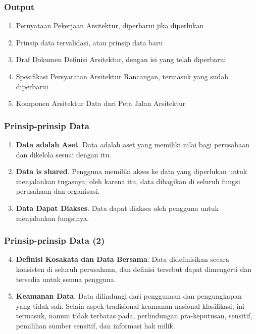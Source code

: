 \documentclass[aspectratio=169, table]{beamer}
\begin{document}
	\begin{frame}
		\frametitle{Output}
		\begin{enumerate}
			\item Pernyataan Pekerjaan Arsitektur, diperbarui jika diperlukan
			\item Prinsip data tervalidasi, atau prinsip data baru
			\item Draf Dokumen Definisi Arsitektur, dengan isi yang telah diperbarui
			\item Spesifikasi Persyaratan Arsitektur Rancangan, termasuk yang sudah diperbarui
			\item Komponen Arsitektur Data dari Peta Jalan Arsitektur
		\end{enumerate}
	\end{frame}

	\begin{frame}
		\frametitle{Prinsip-prinsip Data}
		\begin{enumerate}
			\item \textbf{Data adalah Aset}.
			Data adalah aset yang memiliki nilai bagi perusahaan dan dikelola sesuai dengan itu.
			\item \textbf{Data is shared}.
			Pengguna memiliki akses ke data yang diperlukan untuk menjalankan tugasnya; oleh karena itu, data dibagikan di seluruh fungsi perusahaan
			dan organisasi.
			\item \textbf{Data Dapat Diakses}. Data dapat diakses oleh pengguna untuk menjalankan fungsinya.
		\end{enumerate}
	\end{frame}

	\begin{frame}
		\frametitle{Prinsip-prinsip Data (2)}
		\begin{enumerate}
			\setcounter{enumi}{3}
			\item \textbf{Definisi Kosakata dan Data Bersama}. Data didefinisikan secara konsisten di seluruh perusahaan, dan definisi tersebut dapat dimengerti dan tersedia untuk semua pengguna.
			\item \textbf{Keamanan Data}.
			Data dilindungi dari penggunaan dan pengungkapan yang tidak sah. Selain aspek tradisional keamanan nasional
			klasifikasi, ini termasuk, namun tidak terbatas pada, perlindungan pra-keputusan, sensitif, pemilihan sumber sensitif, dan
			informasi hak milik.
		\end{enumerate}
	\end{frame}
\end{document}

